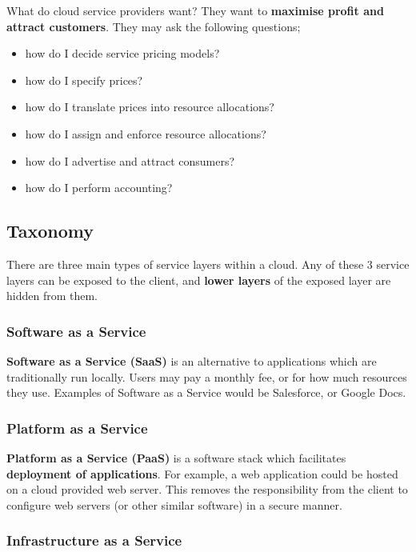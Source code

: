 \documentclass{article}
\begin{document}
What do cloud service providers want? They want to \textbf{maximise profit and attract customers}. They may ask the following questions;
\begin{itemize}
	\item how do I decide service pricing models?
	\item how do I specify prices?
	\item how do I translate prices into resource allocations?
	\item how do I assign and enforce resource allocations?
	\item how do I advertise and attract consumers?
	\item how do I perform accounting?
\end{itemize}

\subsection{Taxonomy}

There are three main types of service layers within a cloud. Any of these 3 service layers can be exposed to the client, and \textbf{lower layers} of the exposed layer are hidden from them.

\subsubsection{Software as a Service}

\textbf{Software as a Service (SaaS)} is an alternative to applications which are traditionally run locally. Users may pay a monthly fee, or for how much resources they use. Examples of Software as a Service would be Salesforce, or Google Docs.

\subsubsection{Platform as a Service}

\textbf{Platform as a Service (PaaS)} is a software stack which facilitates \textbf{deployment of applications}. For example, a web application could be hosted on a cloud provided web server. This removes the responsibility from the client to configure web servers (or other similar software) in a secure manner.

\subsubsection{Infrastructure as a Service}
\end{document}
